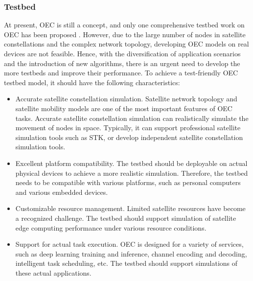 \documentclass[lettersize,journal]{IEEEtran}
\begin{document}
\subsubsection*{Testbed}
At present, OEC is still a concept, and only one comprehensive testbed work on OEC has been proposed \cite{RN102}. However, due to the large number of nodes in satellite constellations and the complex network topology, developing OEC models on real devices are not feasible. Hence, with the diversification of application scenarios and the introduction of new algorithms, there is an urgent need to develop the more testbeds and improve their performance. To achieve a test-friendly OEC testbed model, it should have the following characteristics:
\begin{itemize}
  \item Accurate satellite constellation simulation. Satellite network topology and satellite mobility models are one of the most important features of OEC tasks. Accurate satellite constellation simulation can realistically simulate the movement of nodes in space. Typically, it can support professional satellite simulation tools such as STK, or develop independent satellite constellation simulation tools. 
  \item Excellent platform compatibility. The testbed should be deployable on actual physical devices to achieve a more realistic simulation. Therefore, the testbed needs to be compatible with various platforms, such as personal computers and various embedded devices.
  \item Customizable resource management. Limited satellite resources have become a recognized challenge. The testbed should support simulation of satellite edge computing performance under various resource conditions.
  \item Support for actual task execution. OEC is designed for a variety of services, such as deep learning training and inference, channel encoding and decoding, intelligent task scheduling, etc. The testbed should support simulations of these actual applications.
\end{itemize}
\end{document}
